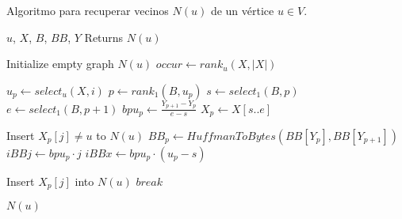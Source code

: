 \begin{algorithm}[H]
\caption{Algoritmo para recuperar vecinos $N(u)$ de un vértice $u \in V$.}
\label{alg:neighbors}
\begin{algorithmic}[1]
    \REQUIRE $u$, $X$, $B$, $BB$, $Y$
    \ENSURE Returns $N(u)$

    \STATE Initialize empty graph $N(u)$
    \STATE $occur \leftarrow rank_{u}(X, |X|)$

        	\STATE $u_{p} \leftarrow select_{u}(X, i)$
        	\STATE $p \leftarrow rank_{1}(B, u_{p})$
        	\STATE $s \leftarrow select_{1}(B, p)$
    		\STATE $e \leftarrow select_{1}(B, p + 1)$
        	\STATE $bpu_{p} \leftarrow \frac{Y_{p + 1} - Y_{p}}{e - s}$
        	\STATE $X_{p} \leftarrow X[s..e]$

       		
            			\STATE Insert $X_{p}[j] \neq u$ to $N(u)$
            		\ELSE
                		\STATE $BB_{p} \leftarrow \mathit{HuffmanToBytes}(BB[Y_{p}], BB[Y_{p + 1}])$
                		\STATE $iBBj \leftarrow bpu_{p} \cdot j$
                		\STATE $iBBx \leftarrow bpu_{p} \cdot (u_{p} - s)$
                		
                    			\STATE Insert $X_{p}[j]$ into $N(u)$
                    			\STATE $break$
                			\ENDIF
            			\ENDFOR
            		\ENDIF
            		
            	\ENDIF
        \ENDFOR
    \ENDFOR

    \RETURN $N(u)$
\end{algorithmic}
\end{algorithm}
